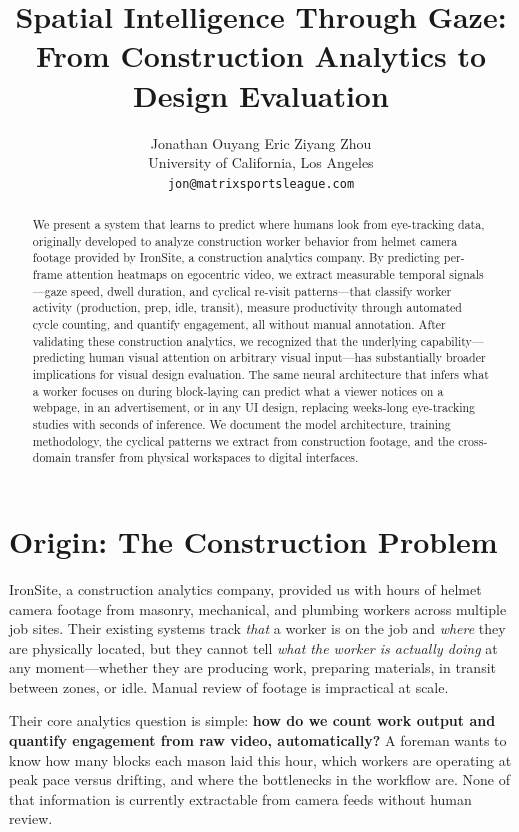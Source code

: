 \documentclass{article}
\title{Spatial Intelligence Through Gaze: From Construction Analytics to Design Evaluation}
\author{
Jonathan Ouyang \quad Eric Ziyang Zhou \\
University of California, Los Angeles \\
\texttt{jon@matrixsportsleague.com}
}
\begin{document}
\maketitle

\begin{abstract}
We present a system that learns to predict where humans look from eye-tracking data, originally developed to analyze construction worker behavior from helmet camera footage provided by IronSite, a construction analytics company. By predicting per-frame attention heatmaps on egocentric video, we extract measurable temporal signals---gaze speed, dwell duration, and cyclical re-visit patterns---that classify worker activity (production, prep, idle, transit), measure productivity through automated cycle counting, and quantify engagement, all without manual annotation. After validating these construction analytics, we recognized that the underlying capability---predicting human visual attention on arbitrary visual input---has substantially broader implications for visual design evaluation. The same neural architecture that infers what a worker focuses on during block-laying can predict what a viewer notices on a webpage, in an advertisement, or in any UI design, replacing weeks-long eye-tracking studies with seconds of inference. We document the model architecture, training methodology, the cyclical patterns we extract from construction footage, and the cross-domain transfer from physical workspaces to digital interfaces.
\end{abstract}

\section{Origin: The Construction Problem}

IronSite, a construction analytics company, provided us with hours of helmet camera footage from masonry, mechanical, and plumbing workers across multiple job sites. Their existing systems track \textit{that} a worker is on the job and \textit{where} they are physically located, but they cannot tell \textit{what the worker is actually doing} at any moment---whether they are producing work, preparing materials, in transit between zones, or idle. Manual review of footage is impractical at scale.

Their core analytics question is simple: \textbf{how do we count work output and quantify engagement from raw video, automatically?} A foreman wants to know how many blocks each mason laid this hour, which workers are operating at peak pace versus drifting, and where the bottlenecks in the workflow are. None of that information is currently extractable from camera feeds without human review.
\end{document}
